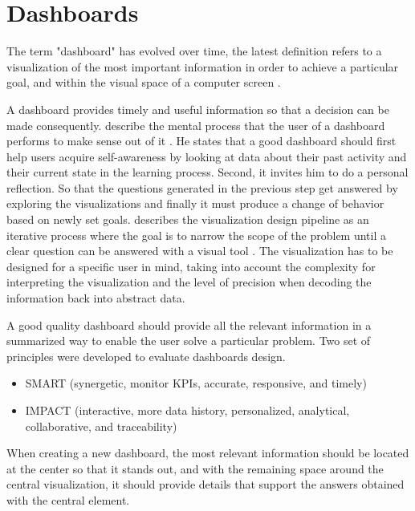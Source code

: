 \section{Dashboards}

The term "dashboard" has evolved over time, the latest definition refers to a visualization of the most important information in order to achieve a particular goal, and within the visual space of a computer screen \cite{Park2015}.

A dashboard provides timely and useful information so that a decision can be made consequently. \citeauthor{Verbert2013} describe the mental process that the user of a dashboard performs to make sense out of it \cite{Verbert2013}. He states that a good dashboard should first help users acquire self-awareness by looking at data about their past activity and their current state in the learning process. Second, it invites him to do a personal reflection. So that the questions generated in the previous step get answered by exploring the visualizations and finally it must produce a change of behavior based on newly set goals. \citeauthor{Telea2017} describes the visualization design pipeline as an iterative process where the goal is to narrow the scope of the problem until a clear question can be answered with a visual tool \cite{Telea2017}. The visualization has to be designed for a specific user in mind, taking into account the complexity for interpreting the visualization and the level of precision when decoding the information back into abstract data.

A good quality dashboard should provide all the relevant information in a summarized way to enable the user solve a particular problem. Two set of principles were developed to evaluate dashboards design. 
\begin{itemize}
	\item SMART (synergetic, monitor KPIs, accurate, responsive,
	and timely)
	\item IMPACT (interactive, more data history, personalized, analytical, collaborative, and traceability) \cite{Malik2005}\\
	
\end{itemize}

When creating a new dashboard, the most relevant information should be located at the center so that it stands out, and with the remaining space around the central visualization, it should provide details that support the answers obtained with the central element.

